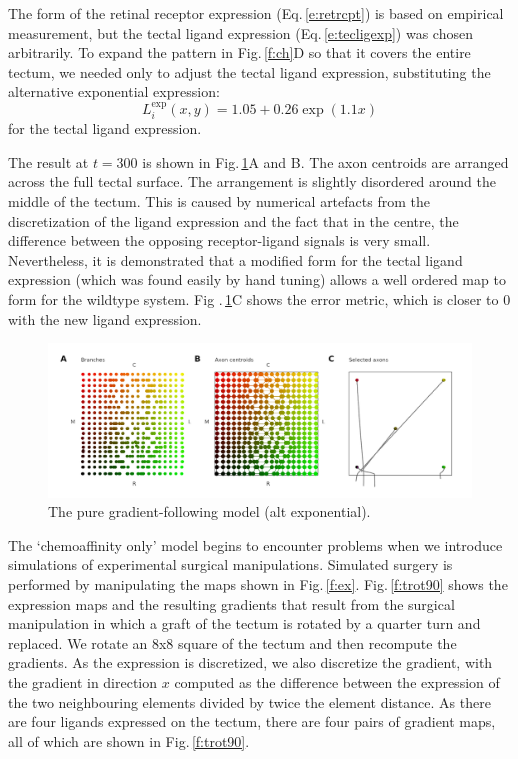 \documentclass[11pt, a4paper]{article}
\begin{document}
The form of the retinal receptor expression (Eq.\,\ref{e:retrcpt}) is based on
empirical measurement, but the tectal ligand expression
(Eq.\,\ref{e:tecligexp}) was chosen arbitrarily. To expand the pattern in
Fig.\,\ref{f:ch}D so that it covers the entire tectum, we needed only to
adjust the tectal ligand expression, substituting the alternative exponential
expression:
%
\begin{equation} \label{e:tecligexp2}
L_i^{\text{exp}}(x,y) = 1.05 + 0.26 \exp(1.1 x)
\end{equation}
%
for the tectal ligand expression.

The result at $t=300$ is shown in Fig.\,\ref{f:chalt}A and B. The axon
centroids are arranged across the full tectal surface.  The arrangement is
slightly disordered around the middle of the tectum. This is caused by
numerical artefacts from the discretization of the ligand expression and the
fact that in the centre, the difference between the opposing receptor-ligand
signals is very small. Nevertheless, it is demonstrated that a modified form
for the tectal ligand expression (which was found easily by hand tuning)
allows a well ordered map to form for the wildtype system. Fig
.\,\ref{f:chalt}C shows the error metric, which is closer to 0 with the new
ligand expression.

\begin{figure}
\includegraphics[width=\linewidth]{./images/j4_eE_G_wt_fig3.png}
\caption{The pure gradient-following model (alt exponential).}
\label{f:chalt}
\end{figure}

The `chemoaffinity only' model begins to encounter problems when we introduce
simulations of experimental surgical manipulations. Simulated surgery is
performed by manipulating the maps shown in
Fig.\,\ref{f:ex}. Fig.\,\ref{f:trot90} shows the expression maps and the
resulting gradients that result from the surgical manipulation in which a
graft of the tectum is rotated by a quarter turn and replaced. We rotate an
8x8 square of the tectum and then recompute the gradients. As the expression
is discretized, we also discretize the gradient, with the gradient in
direction $x$ computed as the difference between the expression of the two
neighbouring elements divided by twice the element distance. As there are four
ligands expressed on the tectum, there are four pairs of gradient maps, all of
which are shown in Fig.\,\ref{f:trot90}.
\end{document}
